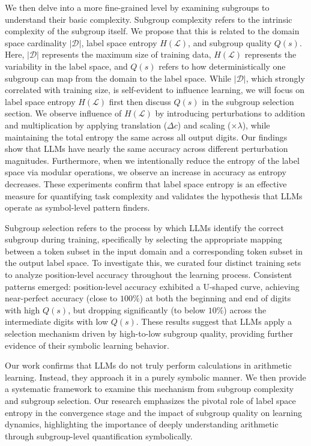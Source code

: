\documentclass[11pt]{article}
\begin{document}
We then delve into a more fine-grained level by examining subgroups to understand their basic complexity. Subgroup complexity refers to the intrinsic complexity of the subgroup itself. We propose that this is related to the domain space cardinality $|\mathcal{D}|$, label space entropy $H(\mathcal{L})$, and subgroup quality $Q(s)$. Here, $|\mathcal{D}|$ represents the maximum size of training data, $H(\mathcal{L})$ represents the variability in the label space, and $Q(s)$ refers to how deterministically one subgroup can map from the domain to the label space. While $|\mathcal{D}|$, which strongly correlated with training size, is self-evident to influence learning, we will focus on label space entropy $H(\mathcal{L})$ first then discuss $Q(s)$ in the subgroup selection section. We observe influence of $H(\mathcal{L})$ by introducing perturbations to addition and multiplication by applying translation ($\Delta c$) and scaling ($\times \lambda$), while maintaining the total entropy the same across all output digits. Our findings show that LLMs have nearly the same accuracy across different perturbation magnitudes. Furthermore, when we intentionally reduce the entropy of the label space via modular operations, we observe an increase in accuracy as entropy decreases. These experiments confirm that label space entropy is an effective measure for quantifying task complexity and validates the hypothesis that LLMs operate as symbol-level pattern finders.

Subgroup selection refers to the process by which LLMs identify the correct subgroup during training, specifically by selecting the appropriate mapping between a token subset in the input domain and a corresponding token subset in the output label space. To investigate this, we curated four distinct training sets to analyze position-level accuracy throughout the learning process. Consistent patterns emerged: position-level accuracy exhibited a U-shaped curve, achieving near-perfect accuracy (close to $100\%$) at both the beginning and end of digits with high $Q(s)$, but dropping significantly (to below $10\%$) across the intermediate digits with low $Q(s)$. These results suggest that LLMs apply a selection mechanism driven by high-to-low subgroup quality, providing further evidence of their symbolic learning behavior.

Our work confirms that LLMs do not truly perform calculations in arithmetic learning. Instead, they approach it in a purely symbolic manner. We then provide a systematic framework to examine this mechanism from subgroup complexity and subgroup selection. Our research emphasizes the pivotal role of label space entropy in the convergence stage and the impact of subgroup quality on learning dynamics, highlighting the importance of deeply understanding arithmetic through subgroup-level quantification symbolically.
\end{document}
